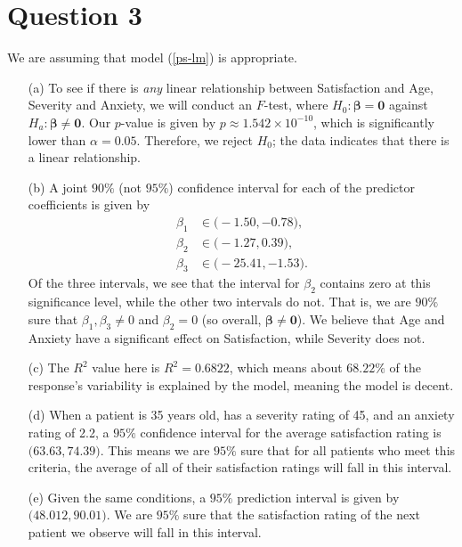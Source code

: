 \documentclass[10pt]{article}
\begin{document}
\section{Question 3} \noindent
We are assuming that model (\ref{ps-lm}) is appropriate. 
\begin{itemize}
    \item[(a)] To see if there is \textsl{any} linear relationship between Satisfaction and Age, Severity and Anxiety, we will conduct an \(F\)-test, where 
    \(H_0 : \bm{\beta} = \mathbf{0}\) against \(H_a : \bm{\beta} \neq \mathbf{0}\). Our \(p\)-value is given by 
    \(p \approx 1.542 \times 10^{-10}\), which is significantly lower than \(\alpha = 0.05\). Therefore, we reject \(H_0\); the data indicates that 
    there is a linear relationship. 
    \item[(b)] A joint \(90\%{}\) (not \(95\%{}\)) confidence interval for each of the predictor coefficients is given by 
    \begin{align*}
        \beta_1 &\in \big( -1.50 , -0.78 \big), \\
        \beta_2 &\in \big( -1.27 ,  0.39 \big), \\
        \beta_3 &\in \big( -25.41 , -1.53 \big).
    \end{align*}
    Of the three intervals, we see that the interval for \(\beta_2\) contains zero at this significance level, while the other two intervals do not. That is,
    we are \(90\%{}\) sure that \(\beta_1, \beta_3 \neq 0\) and \(\beta_2 = 0\) (so overall, \(\bm{\beta} \neq \mathbf{0}\)). We believe that 
    Age and Anxiety have a significant effect on Satisfaction, while Severity does not. 
    \item[(c)] The \(R^2\) value here is \(R^2 = 0.6822\), which means about \(68.22\%{}\) of the response's variability is explained by the model, meaning the 
    model is decent. 
    \item[(d)] When a patient is 35 years old, has a severity rating of 45, and an anxiety rating of 2.2, a \(95\%{}\) confidence interval for the average 
    satisfaction rating is \(\big( 63.63, 74.39 \big)\). This means we are \(95\%{}\) sure that for all patients who meet this criteria, the average of 
    all of their satisfaction ratings will fall in this interval. 
    \item[(e)] Given the same conditions, a \(95\%{}\) prediction interval is given by \(\big( 48.012, 90.01 \big)\). We are \(95\%{}\) sure that the satisfaction 
    rating of the next patient we observe will fall in this interval.
\end{itemize}
\end{document}
